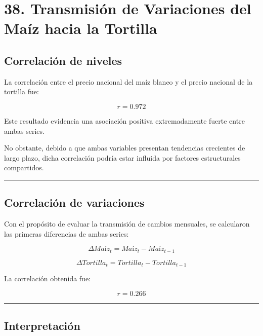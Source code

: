 \documentclass[11pt]{article}
\begin{document}
    \hypertarget{transmisiuxf3n-de-variaciones-del-mauxedz-hacia-la-tortilla}{%
\section{38. Transmisión de Variaciones del Maíz hacia la
Tortilla}\label{transmisiuxf3n-de-variaciones-del-mauxedz-hacia-la-tortilla}}

\hypertarget{correlaciuxf3n-de-niveles}{%
\subsection{Correlación de niveles}\label{correlaciuxf3n-de-niveles}}

La correlación entre el precio nacional del maíz blanco y el precio
nacional de la tortilla fue:

\[
r = 0.972
\]

Este resultado evidencia una asociación positiva extremadamente fuerte
entre ambas series.

No obstante, debido a que ambas variables presentan tendencias
crecientes de largo plazo, dicha correlación podría estar influida por
factores estructurales compartidos.

\begin{center}\rule{0.5\linewidth}{0.5pt}\end{center}

\hypertarget{correlaciuxf3n-de-variaciones}{%
\subsection{Correlación de
variaciones}\label{correlaciuxf3n-de-variaciones}}

Con el propósito de evaluar la transmisión de cambios mensuales, se
calcularon las primeras diferencias de ambas series:

\[
\Delta Maíz_t
=
Maíz_t - Maíz_{t-1}
\]

\[
\Delta Tortilla_t
=
Tortilla_t - Tortilla_{t-1}
\]

La correlación obtenida fue:

\[
r = 0.266
\]

\begin{center}\rule{0.5\linewidth}{0.5pt}\end{center}

\hypertarget{interpretaciuxf3n}{%
\subsection{Interpretación}\label{interpretaciuxf3n}}
\end{document}

